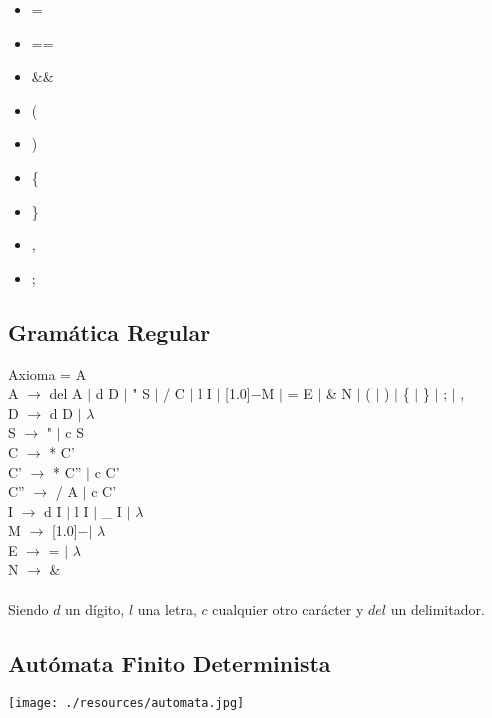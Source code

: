 \documentclass[11pt, , a4paper, titlepage]{article}
\newenvironment{myitemize}
{ \begin{itemize}
    \setlength{\itemsep}{0pt}
    \setlength{\parskip}{2pt}    }
{ \end{itemize}                  }
\newcommand{\minus}{\scalebox{0.75}[1.0]{$-$}}
\newenvironment{changemargin}[2]{%
\begin{list}{}{%
\setlength{\topsep}{0pt}%
\setlength{\leftmargin}{#1}%
\setlength{\rightmargin}{#2}%
\setlength{\listparindent}{\parindent}%
\setlength{\itemindent}{\parindent}%
\setlength{\parsep}{\parskip}%
}%
\item[]}{\end{list}}
\begin{document}
\begin{changemargin}{0cm}{+4cm}
\begin{flushleft}
\begin{myitemize}
            \item =
            \item == 
            \item \&\& 
            \item ( 
                  \item ) 
            \item \{ 
            \item \} 
            \item , 
            \item ; 
        \end{myitemize}
    \end{flushleft}
\end{changemargin}
\clearpage

\subsection{Gramática Regular}
\noindent
Axioma = A\\
A $\rightarrow$ del A $|$ d D $|$ " \hspace{1mm} S $|$ / C $|$ l I $|$ \minus  M $|$ = E $|$ \& N $|$ ( $|$ ) $|$ \{ $|$ \} $|$ ; $|$ , \\
D $\rightarrow$ d D $|$ $\lambda$\\
S $\rightarrow$ " \hspace{1mm} $|$ c S\\
C $\rightarrow$ * C'\\
C' $\rightarrow$ * C'' $|$ c C'\\
C'' $\rightarrow$ / A $|$ c C'\\
I $\rightarrow$ d I $|$ l I $|$ \_ I $|$ $\lambda$\\
M $\rightarrow$ \minus \hspace{1.5mm}$|$ $\lambda$\\
E $\rightarrow$ = $|$ $\lambda$\\
N $\rightarrow$ \&\\
\\
Siendo $d$ un dígito, $l$ una letra, $c$ cualquier otro carácter y $del$ un delimitador.

\subsection{Autómata Finito Determinista}
\begin{center}
    \texttt{[image: ./resources/automata.jpg]}
\end{center}
\clearpage
\end{document}
